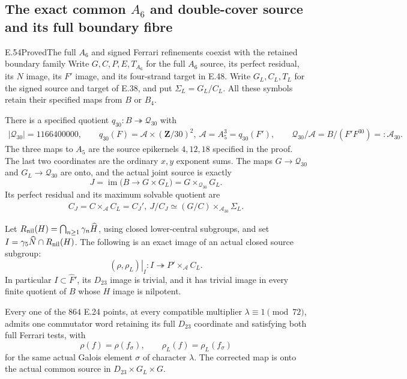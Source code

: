 \subsection{The exact common $A_6$ and double-cover source and its full boundary fibre}

\begin{statement}{E.54}{Proved}{The full $A_6$ and signed Ferrari refinements coexist with the retained boundary family}
Write $G,C,P,E,T_{A_6}$ for the full $A_6$ source, its
perfect residual, its $N$ image, its $F'$ image, and its
four-strand target in E.48.  Write $G_L,C_L,T_L$ for
the signed source and target of E.38, and put
$\Sigma_L=G_L/C_L$.  All these symbols retain their
specified maps from $B$ or $B_4$.

There is a specified quotient $q_{30}:B\twoheadrightarrow
\mathcal Q_{30}$ with
\[
 \begin{gathered}
 |\mathcal Q_{30}|=1166400000,\qquad
 q_{30}(F)=\mathcal A\times(\mathbf Z/30)^2,\
 \mathcal A=A_5^3=q_{30}(F'),\qquad
 \mathcal Q_{30}/\mathcal A
       =B/(F'F^{30})=:\mathcal A_{30}.
 \end{gathered}
 \tag{E.54.1}
\]
The three maps to $A_5$ are the source epikernels
$4,12,18$ specified in the proof.  The last two coordinates
are the ordinary $x,y$ exponent sums.  The maps $G\to
\mathcal Q_{30}$ and $G_L\to\mathcal Q_{30}$ are onto,
and the actual joint source is exactly
\[
 J=\operatorname{im}\bigl(B\longrightarrow G\times G_L\bigr)
     =G\times_{\mathcal Q_{30}}G_L.
 \tag{E.54.2}
\]
Its perfect residual and its maximum solvable quotient are
\[
 \begin{gathered}
 C_J=C\times_{\mathcal A}C_L=C_J',\
 J/C_J\simeq (G/C)\times_{\mathcal A_{30}}\Sigma_L.
 \end{gathered}
 \tag{E.54.3}
\]

Let $R_{\rm nil}(H)=\bigcap_{n\ge1}\gamma_n\widehat H$,
using closed lower-central subgroups, and set
$I=\gamma_5\widehat N\cap R_{\rm nil}(H)$.
The following is an exact image of an actual closed source
subgroup:
\[
 \left.(\rho,\rho_L)\right|_I:
 I\twoheadrightarrow
       P'\times_{\mathcal A}C_L.
 \tag{E.54.4}
\]
In particular $I\subset\widehat F'$, its $D_{23}$ image is
trivial, and it has trivial image in every finite quotient
of $B$ whose $H$ image is nilpotent.

Every one of the $864$ E.24 points, at every compatible
multiplier $\lambda\equiv1\pmod{72}$, admits one commutator
word retaining its full $D_{23}$ coordinate and satisfying
both full Ferrari tests, with
\[
       \rho(f)=\rho(f_\sigma),\qquad
       \rho_L(f)=\rho_L(f_\sigma)
 \tag{E.54.5}
\]
for the same actual Galois element $\sigma$ of character
$\lambda$.  The corrected map is onto the actual common
source in $D_{23}\times G_L\times G$.


\end{statement}
